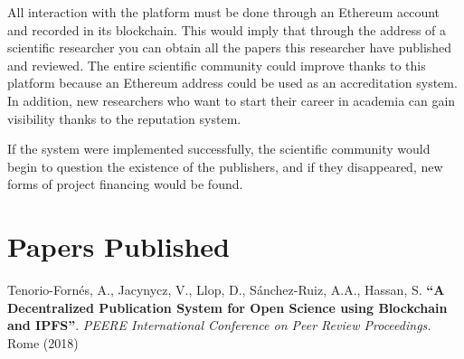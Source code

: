 All interaction with the platform must be done through an Ethereum account and recorded in its blockchain. This would imply that through the address of a scientific researcher you can obtain all the papers this researcher have published and reviewed. The entire scientific community could improve thanks to this platform because an Ethereum address could be used as an accreditation system. In addition, new researchers who want to start their career in academia can gain visibility thanks to the reputation system.

If the system were implemented successfully, the scientific community would begin to question the existence of the publishers, and if they disappeared, new forms of project financing would be found.

\section{Papers Published}

Tenorio-Fornés, A., Jacynycz, V., Llop, D., Sánchez-Ruiz, A.A., Hassan, S.
\textbf{“A Decentralized Publication System for Open Science using Blockchain
and IPFS”}. \emph{PEERE International Conference on Peer Review Proceedings.}
Rome (2018)


